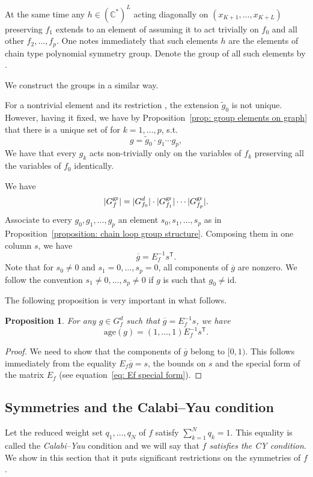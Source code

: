\documentclass[pdftex]{sigma}
\numberwithin{equation}{section}
\newtheorem{Proposition}[Theorem]{Proposition}
 { \theoremstyle{definition}
\newtheorem{Definition}[Theorem]{Definition}
\newtheorem{Note}[Theorem]{Note}
\newtheorem{Example}[Theorem]{Example}
\newtheorem{Remark}[Theorem]{Remark} }
\newcommand{\CC}{{\mathbb{C}}}
\newcommand{\id}{\mathrm{id}}
\newcommand{\age}{\mathrm{age}}
\begin{document}
At the same time any $h \in (\CC^\ast)^{L}$ acting diagonally on $(x_{K+1},\dots,x_{K+L})$ preserving $f_1$ extends to an element of  assuming it to act trivially on $f_0$ and all other $f_2,\dots,f_p$. One notes immediately that such elements $h$ are the elements of chain type polynomial symmetry group. Denote the group of all such elements by .

We construct the groups  in a similar way.

For a nontrivial element  and its restriction , the extension $\widetilde g_0$ is not unique. However, having it fixed, we have by Proposition~\ref{prop: group elements on graph} that there is a unique set of  for $k=1,\dots,p$, s.t.
\[
	g = \widetilde g_0\cdot g_1 \cdots g_p,
\]
We have that every $g_k$ acts non-trivially only on the variables of $f_k$ preserving all the variables of $f_0$ identically.

We have
\[
	|G_f^{\rm gr}| = |G_{f_0}^d|\cdot |G_{f_1}^{\rm gr}| \cdots |G_{f_p}^{\rm gr}|.
\]
Associate to every $g_0,g_1,\dots,g_p$ an element $s_0,s_1,\dots,s_p$ as in Proposition~\ref{proposition: chain loop group structure}. Composing them in one column $s$, we have
\[
	\overline g = E_f^{-1} s^{\mathsf{T}}.
\]
Note that for $s_0 \neq 0$ and $s_1=0, \dots, s_p =0$, all components of $\overline g$ are nonzero. We follow the convention $s_1 \neq 0, \dots, s_p \neq 0$ if $g$ is such that $g_0 \neq \id$.

The following proposition is very important in what follows.

\begin{Proposition}\label{prop: age by matrix}
	For any $g \in G_f^d$ such that $\overline g = E_f^{-1} s$, we have
	\[
	\age(g) = (1,\dots,1) E_f^{-1} s^{\mathsf{T}}.
	\]
\end{Proposition}
\begin{proof}
	We need to show that the components of $\overline g$ belong to $[0,1)$. This follows immediately from the equality $E_f \overline g = s$, the bounds on $s$ and the special form of the matrix $E_f$ (see equation~\eqref{eq: Ef special form}).
\end{proof}

\subsection{Symmetries and the Calabi--Yau condition}\label{section: symmetries under CY}
Let the reduced weight set $q_1,\dots,q_N$ of $f$ satisfy $\sum_{k=1}^N q_k = 1$. This equality is called the \textit{Calabi--Yau} condition and we will say that \textit{$f$ satisfies the CY condition}. We show in this section that it puts significant restrictions on the symmetries of $f$.
\end{document}
